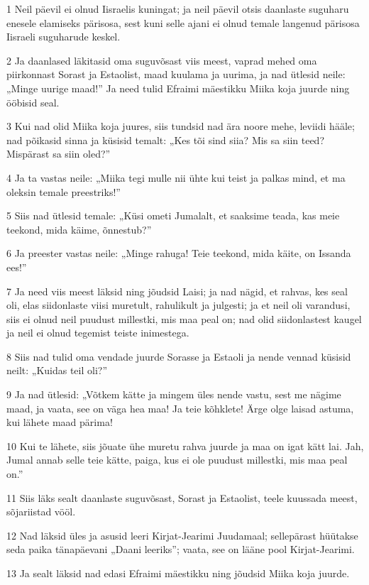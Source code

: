 \par 1 Neil päevil ei olnud Iisraelis kuningat; ja neil päevil otsis daanlaste suguharu enesele elamiseks pärisosa, sest kuni selle ajani ei olnud temale langenud pärisosa Iisraeli suguharude keskel.
\par 2 Ja daanlased läkitasid oma suguvõsast viis meest, vaprad mehed oma piirkonnast Sorast ja Estaolist, maad kuulama ja uurima, ja nad ütlesid neile: „Minge uurige maad!” Ja need tulid Efraimi mäestikku Miika koja juurde ning ööbisid seal.
\par 3 Kui nad olid Miika koja juures, siis tundsid nad ära noore mehe, leviidi hääle; nad põikasid sinna ja küsisid temalt: „Kes tõi sind siia? Mis sa siin teed? Mispärast sa siin oled?”
\par 4 Ja ta vastas neile: „Miika tegi mulle nii ühte kui teist ja palkas mind, et ma oleksin temale preestriks!”
\par 5 Siis nad ütlesid temale: „Küsi ometi Jumalalt, et saaksime teada, kas meie teekond, mida käime, õnnestub?”
\par 6 Ja preester vastas neile: „Minge rahuga! Teie teekond, mida käite, on Issanda ees!”
\par 7 Ja need viis meest läksid ning jõudsid Laisi; ja nad nägid, et rahvas, kes seal oli, elas siidonlaste viisi muretult, rahulikult ja julgesti; ja et neil oli varandusi, siis ei olnud neil puudust millestki, mis maa peal on; nad olid siidonlastest kaugel ja neil ei olnud tegemist teiste inimestega.
\par 8 Siis nad tulid oma vendade juurde Sorasse ja Estaoli ja nende vennad küsisid neilt: „Kuidas teil oli?”
\par 9 Ja nad ütlesid: „Võtkem kätte ja mingem üles nende vastu, sest me nägime maad, ja vaata, see on väga hea maa! Ja teie kõhklete! Ärge olge laisad astuma, kui lähete maad pärima!
\par 10 Kui te lähete, siis jõuate ühe muretu rahva juurde ja maa on igat kätt lai. Jah, Jumal annab selle teie kätte, paiga, kus ei ole puudust millestki, mis maa peal on.”
\par 11 Siis läks sealt daanlaste suguvõsast, Sorast ja Estaolist, teele kuussada meest, sõjariistad vööl.
\par 12 Nad läksid üles ja asusid leeri Kirjat-Jearimi Juudamaal; sellepärast hüütakse seda paika tänapäevani „Daani leeriks”; vaata, see on lääne pool Kirjat-Jearimi.
\par 13 Ja sealt läksid nad edasi Efraimi mäestikku ning jõudsid Miika koja juurde.
